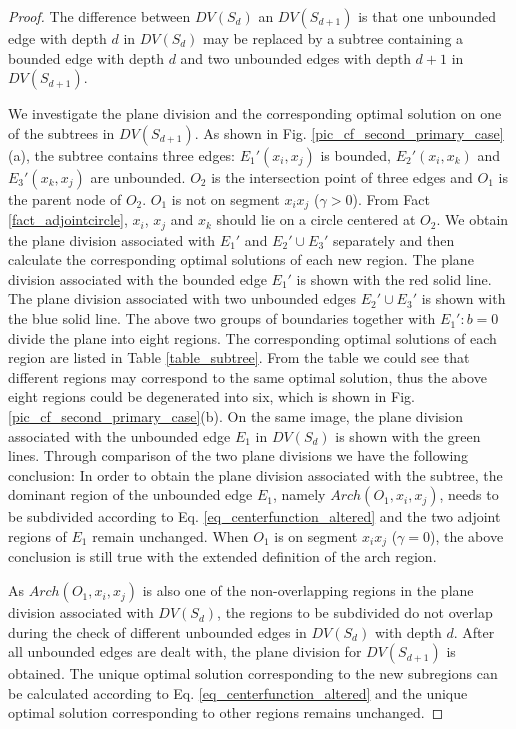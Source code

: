 \documentclass[final,3p,times]{elsarticle}
\begin{document}
\begin{proof}
The difference between $DV(S_d)$ an $DV(S_{d+1})$ is that one unbounded edge with depth $d$ in $DV(S_d)$ may be replaced by a subtree containing a bounded edge with depth $d$ and two unbounded edges with depth $d+1$ in $DV(S_{d+1})$.

We investigate the plane division and the corresponding optimal solution on one of the subtrees in $DV(S_{d+1})$. As shown in Fig. \ref{pic_cf_second_primary_case}(a), the subtree contains three edges: $E_1'(x_i,x_j)$ is bounded, $E_2'(x_i,x_k)$ and $E_3'(x_k,x_j)$ are unbounded. $O_2$ is the intersection point of three edges and $O_1$ is the parent node of $O_2$. $O_1$ is not on segment $x_ix_j$ ($\gamma>0$). From Fact \ref{fact_adjointcircle}, $x_i$, $x_j$ and $x_k$ should lie on a circle centered at $O_2$.  We obtain the plane division associated with $E_1'$ and $E_2'\cup E_3'$ separately and then calculate the corresponding optimal solutions of each new region. The plane division associated with the bounded edge $E_1'$ is shown with the red solid line. The plane division associated with two unbounded edges $E_2'\cup E_3'$ is shown with the blue solid line. The above two groups of boundaries together with $E_1':b=0$ divide the plane into eight regions. The corresponding optimal solutions of each region are listed in Table \ref{table_subtree}. From the table we could see that different regions may correspond to the same optimal solution, thus the above eight regions could be degenerated into six, which is shown in Fig. \ref{pic_cf_second_primary_case}(b). On the same image, the plane division associated with the unbounded edge $E_1$ in $DV(S_d)$ is shown with the green lines. Through comparison of the two plane divisions we have the following conclusion: In order to obtain the plane division associated with the subtree, the dominant region of the unbounded edge $E_1$, namely $Arch(O_1,x_i,x_j)$, needs to be subdivided according to Eq. \eqref{eq_centerfunction_altered} and the two adjoint regions of $E_1$ remain unchanged. When $O_1$ is on segment $x_ix_j$ ($\gamma=0$), the above conclusion is still true with the extended definition of the arch region.

As $Arch(O_1,x_i,x_j)$ is also one of the non-overlapping regions in the plane division associated with $DV(S_d)$, the regions to be subdivided do not overlap during the check of different unbounded edges in $DV(S_d)$ with depth $d$. After all unbounded edges are dealt with, the plane division for $DV(S_{d+1})$ is obtained. The unique optimal solution corresponding to the new subregions can be calculated according to Eq. \eqref{eq_centerfunction_altered} and the unique optimal solution corresponding to other regions remains unchanged.

\end{proof}
\end{document}

